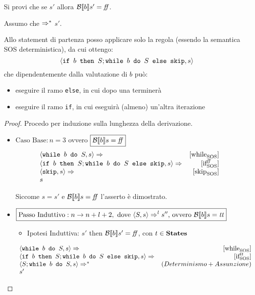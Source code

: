 {
 Si provi che se  \Rar{*} $s'$ allora
 $\B{b}' = \semfalse$.
}
{
Assumo che  $\Rar{*}$ $s'$.

Allo statement di partenza posso applicare solo la regola \whileSOS
(essendo la semantica SOS deterministica), da cui ottengo:
$$
  \confSs{\ifABC{b}{S; \wbS{b}{S}}{\skipForFriends}}{s} 
$$
che dipendentemente dalla valutazione di $b$ può:
\begin{itemize}
  \item eseguire il ramo \texttt{else}, in cui dopo una 
    \skipForFriends{} terminerà 
  \item eseguire il ramo \texttt{if}, in cui eseguirà (almeno) 
    un'altra iterazione
\end{itemize}
\begin{proof}
Procedo per induzione sulla lunghezza della derivazione.

\begin{itemize}
  \item $\boxed{\text{Caso Base}: n = 3}$ ovvero $\boxed{\B{b} = \semfalse}$
  $$
  \begin{array}{lrr}
  \confSs{\wbS{b}{S}}{s} \Rar{} & \whileSOS & \\
  \confSs{\ifABC{b}{S; \wbS{b}{S}}{\skipForFriends}}{s} \Rar{} & \ifffSOS & \\
  \confSs{\skipForFriends}{s} \Rar{} & \skipSOS & \\
  s & & \\
  \end{array}
  $$

Siccome $s = s'$ e $\B{b} = \semfalse$ l'asserto è dimostrato.

  \item $\boxed{\text{Passo Induttivo}: n \rightarrow n + l + 2,
    \text{ dove } \confSs{S}{s} \Rar{l} s'' \text{, ovvero } \B{b} = \semtrue}$
    \begin{itemize}
      \item Ipotesi Induttiva:   $s'$ then
      $\B{b}' = \semfalse$, con $t\in\states$
    \end{itemize}
    $$
    \begin{array}{lrr}
    \confSs{\wbS{b}{S}}{s} \Rar{} & \whileSOS & \\
    \confSs{\ifABC{b}{S; \wbS{b}{S}}{\skipForFriends}}{s} \Rar{} & \ifttSOS & \\
    \confSs{S; \wbS{b}{S}}{s} \Rar{*} & (Determinismo + Assunzione) & \\
    s' & & \\
    \end{array}
    $$


\end{itemize}
\end{proof}}
